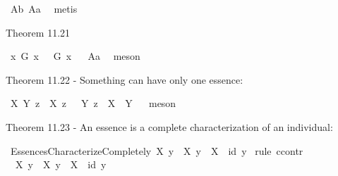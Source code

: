 \begin{isabellebody}
\ A{}b\ A{}a\ \isamarkupfalse%
\ metis%
\endisatagproof
{\isafoldproof}%
%
\isadelimproof
%
\endisadelimproof
%
\begin{isamarkuptext}%
Theorem 11.21%
\end{isamarkuptext}\isamarkuptrue%
\isamarkupfalse%
\ {\isachardoublequoteopen}{\isasymlfloor}\isactrlbold {\isasymforall}x{\isachardot}\ G{\isacharasterisk}\ x\ \isactrlbold {\isasymrightarrow}\ {\isacharparenleft}{\isasymE}\ G{\isacharasterisk}\ x{\isacharparenright}{\isasymrfloor}{\isachardoublequoteclose}%
\isadelimproof
\ %
\endisadelimproof
%
\isatagproof
{}\isamarkupfalse%
\ A{}a\ \isamarkupfalse%
\ meson%
\endisatagproof
{\isafoldproof}%
%
\isadelimproof
%
\endisadelimproof
%
\begin{isamarkuptext}%
Theorem 11.22 - Something can have only one essence:%
\end{isamarkuptext}\isamarkuptrue%
\isamarkupfalse%
\ {\isachardoublequoteopen}{\isasymlfloor}\isactrlbold {\isasymforall}X\ Y\ z{\isachardot}\ {\isacharparenleft}{\isasymE}\ X\ z\ \isactrlbold {\isasymand}\ {\isasymE}\ Y\ z{\isacharparenright}\ \isactrlbold {\isasymrightarrow}\ {\isacharparenleft}X\ {\isasymRrightarrow}\ Y{\isacharparenright}{\isasymrfloor}{\isachardoublequoteclose}%
\isadelimproof
\ %
\endisadelimproof
%
\isatagproof
{}\isamarkupfalse%
\ meson%
\endisatagproof
{\isafoldproof}%
%
\isadelimproof
%
\endisadelimproof
%
\begin{isamarkuptext}%
Theorem 11.23 - An essence is a complete characterization of an individual:%
\end{isamarkuptext}\isamarkuptrue%
\isamarkupfalse%
\ EssencesCharacterizeCompletely{\isacharcolon}\ {\isachardoublequoteopen}{\isasymlfloor}\isactrlbold {\isasymforall}X\ y{\isachardot}\ {\isasymE}\ X\ y\ \isactrlbold {\isasymrightarrow}\ {\isacharparenleft}X\ {\isasymRrightarrow}\ {\isacharparenleft}id\ y{\isacharparenright}{\isacharparenright}{\isasymrfloor}{\isachardoublequoteclose}\isanewline
%
\isadelimproof
%
\endisadelimproof
%
\isatagproof
{}\isamarkupfalse%
\ {\isacharparenleft}rule\ ccontr{\isacharparenright}\isanewline
\ \ \isamarkupfalse%
\ {\isachardoublequoteopen}{\isasymnot}\ {\isasymlfloor}\isactrlbold {\isasymforall}X\ y{\isachardot}\ {\isasymE}\ X\ y\ \isactrlbold {\isasymrightarrow}\ {\isacharparenleft}X\ {\isasymRrightarrow}\ {\isacharparenleft}id\ y{\isacharparenright}{\isacharparenright}{\isasymrfloor}{\isachardoublequoteclose}\isanewline

\end{isabellebody}
